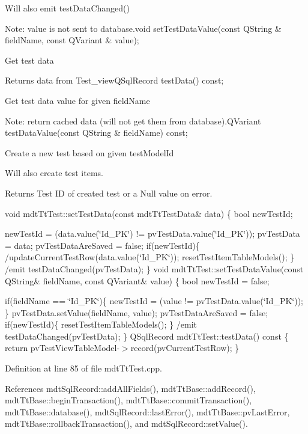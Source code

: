 Will also emit test\-Data\-Changed()

Note\-: value is not sent to database.\-void set\-Test\-Data\-Value(const Q\-String \& field\-Name, const Q\-Variant \& value);

Get test data

Returns data from Test\-\_\-view\-Q\-Sql\-Record test\-Data() const;

Get test data value for given field\-Name

Note\-: return cached data (will not get them from database).Q\-Variant test\-Data\-Value(const Q\-String \& field\-Name) const;

Create a new test based on given test\-Model\-Id

Will also create test items.

\begin{DoxyReturn}{Returns}
Test I\-D of created test or a Null value on error.
\end{DoxyReturn}
void mdt\-Tt\-Test\-::set\-Test\-Data(const mdt\-Tt\-Test\-Data\& data) \{ bool new\-Test\-Id;

new\-Test\-Id = (data.\-value(\char`\"{}\-Id\-\_\-\-P\-K\char`\"{}) != pv\-Test\-Data.\-value(\char`\"{}\-Id\-\_\-\-P\-K\char`\"{})); pv\-Test\-Data = data; pv\-Test\-Data\-Are\-Saved = false; if(new\-Test\-Id)\{ /update\-Current\-Test\-Row(data.\-value(\char`\"{}\-Id\-\_\-\-P\-K\char`\"{})); reset\-Test\-Item\-Table\-Models(); \} /emit test\-Data\-Changed(pv\-Test\-Data); \} void mdt\-Tt\-Test\-::set\-Test\-Data\-Value(const Q\-String\& field\-Name, const Q\-Variant\& value) \{ bool new\-Test\-Id = false;

if(field\-Name == \char`\"{}\-Id\-\_\-\-P\-K\char`\"{})\{ new\-Test\-Id = (value != pv\-Test\-Data.\-value(\char`\"{}\-Id\-\_\-\-P\-K\char`\"{})); \} pv\-Test\-Data.\-set\-Value(field\-Name, value); pv\-Test\-Data\-Are\-Saved = false; if(new\-Test\-Id)\{ reset\-Test\-Item\-Table\-Models(); \} /emit test\-Data\-Changed(pv\-Test\-Data); \} Q\-Sql\-Record mdt\-Tt\-Test\-::test\-Data() const \{ return pv\-Test\-View\-Table\-Model-\/$>$record(pv\-Current\-Test\-Row); \} 

Definition at line 85 of file mdt\-Tt\-Test.\-cpp.



References mdt\-Sql\-Record\-::add\-All\-Fields(), mdt\-Tt\-Base\-::add\-Record(), mdt\-Tt\-Base\-::begin\-Transaction(), mdt\-Tt\-Base\-::commit\-Transaction(), mdt\-Tt\-Base\-::database(), mdt\-Sql\-Record\-::last\-Error(), mdt\-Tt\-Base\-::pv\-Last\-Error, mdt\-Tt\-Base\-::rollback\-Transaction(), and mdt\-Sql\-Record\-::set\-Value().

